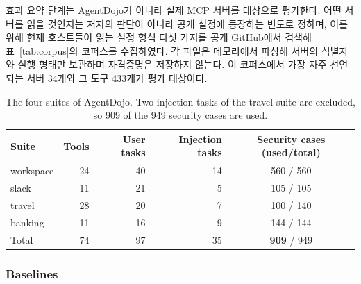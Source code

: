 \documentclass[acmsmall,screen,review,anonymous]{acmart}
\begin{document}
효과 요약 단계는 AgentDojo가 아니라 실제 MCP 서버를 대상으로 평가한다. 어떤 서버를 읽을 것인지는 저자의 판단이 아니라 공개 설정에 등장하는 빈도로 정하며, 이를 위해 현재 호스트들이 읽는 설정 형식 다섯 가지를 공개 GitHub에서 검색해 표~\ref{tab:corpus}의 코퍼스를 수집하였다. 각 파일은 메모리에서 파싱해 서버의 식별자와 실행 형태만 보관하며 자격증명은 저장하지 않는다. 이 코퍼스에서 가장 자주 선언되는 서버 34개와 그 도구 433개가 평가 대상이다.




\begin{table}[t]
\caption{The four suites of AgentDojo. Two injection tasks of the travel suite are excluded, so 909 of the 949 security cases are used.}
\label{tab:cases}
\small
\begin{tabular}{lrrrc}
\toprule
Suite & Tools & User tasks & Injection tasks & Security cases (used/total) \\
\midrule
workspace & 24 & 40 & 14 & 560 / 560 \\
slack     & 11 & 21 &  5 & 105 / 105 \\
travel    & 28 & 20 &  7 & 100 / 140 \\
banking   & 11 & 16 &  9 & 144 / 144 \\
\midrule
Total     & 74 & 97 & 35 & \textbf{909} / 949 \\
\bottomrule
\end{tabular}
\end{table}


\subsubsection{Baselines}
\end{document}
